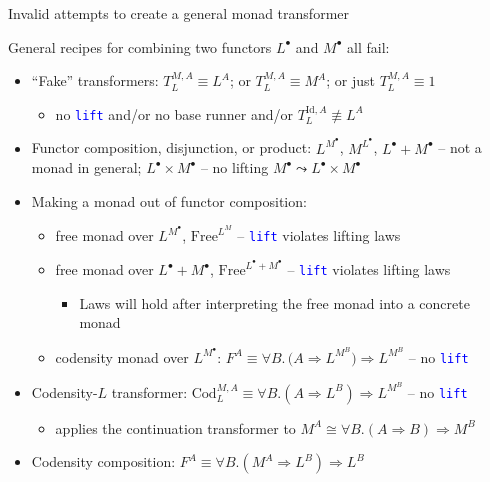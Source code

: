 \documentclass[english]{beamer}
\begin{document}
\begin{frame}{Invalid attempts to create a general monad transformer}

{\footnotesize{}\vspace{-0.2cm}}General recipes for combining two
functors $L^{\bullet}$ and $M^{\bullet}$ all fail:
\begin{itemize}
\item ``Fake'' transformers: $T_{L}^{M,A}\equiv L^{A}$; or $T_{L}^{M,A}\equiv M^{A}$;
or just $T_{L}^{M,A}\equiv1$
\begin{itemize}
\item no \texttt{\textcolor{blue}{\footnotesize{}lift}} and/or no base runner
and/or $T_{L}^{\text{Id},A}\not\equiv L^{A}$
\end{itemize}
\item Functor composition, disjunction, or product: $L^{M^{\bullet}}$,
$M^{L^{\bullet}}$, $L^{\bullet}+M^{\bullet}$ -- not a monad in
general; $L^{\bullet}\times M^{\bullet}$ -- no lifting $M^{\bullet}\leadsto L^{\bullet}\times M^{\bullet}$
\item Making a monad out of functor composition:
\begin{itemize}
\item free monad over $L^{M^{\bullet}}$, $\text{Free}^{L^{M}}$ -- \texttt{\textcolor{blue}{\footnotesize{}lift}}
violates lifting laws
\item free monad over $L^{\bullet}+M^{\bullet}$, $\text{Free}^{L^{\bullet}+M^{\bullet}}$
-- \texttt{\textcolor{blue}{\footnotesize{}lift}} violates lifting
laws
\begin{itemize}
\item Laws will hold after interpreting the free monad into a concrete monad
\end{itemize}
\item codensity monad over $L^{M^{\bullet}}$: $F^{A}\equiv\forall B.\,\big(A\Rightarrow L^{M^{B}}\big)\Rightarrow L^{M^{B}}$
-- no \texttt{\textcolor{blue}{\footnotesize{}lift}} 
\end{itemize}
\item Codensity-$L$ transformer: $\text{Cod}_{L}^{M,A}\equiv\forall B.\left(A\Rightarrow L^{B}\right)\Rightarrow L^{M^{B}}$
-- no \texttt{\textcolor{blue}{\footnotesize{}lift}} 
\begin{itemize}
\item applies the continuation transformer to $M^{A}\cong\forall B.\left(A\Rightarrow B\right)\Rightarrow M^{B}$
\end{itemize}
\item Codensity composition: $F^{A}\equiv\forall B.\left(M^{A}\Rightarrow L^{B}\right)\Rightarrow L^{B}$

\end{itemize}
\end{frame}
\end{document}
